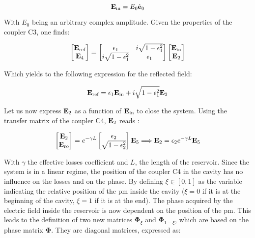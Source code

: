 \begin{equation}
	\mathbf{E}_{\text{in}} = E_0 \hat{\mathbf{e}}_0
\end{equation}

With $E_0$ being an arbitrary complex amplitude. Given the properties of the coupler C3, one finds:

\begin{equation}
	\begin{bmatrix}
		\mathbf{E}_{\text{ref}}\\
		\mathbf{E}_{\text{4}}
	\end{bmatrix} = \begin{bmatrix}
		\epsilon_1 & i\sqrt{1-\epsilon_1^2} \\
		i\sqrt{1-\epsilon_1^2} & \epsilon_1
	\end{bmatrix}
	\begin{bmatrix}
		\mathbf{E}_{\text{in}}\\
		\mathbf{E}_{\text{2}}
	\end{bmatrix} 
\end{equation}

Which yields to the following expression for the reflected field:

\begin{equation}
	\mathbf{E}_{\text{ref}} = \epsilon_1 \mathbf{E}_{\text{in}} + i \sqrt{1-\epsilon_1^2} \mathbf{E}_{\text{2}}
	\label{eq-ref}
\end{equation}

Let us now express $\mathbf{E}_{\text{2}}$ as a function of $\mathbf{E}_{\text{in}}$ to close the system. Using the transfer matrix of the coupler C4, $\mathbf{E}_{\text{2}}$ reads :

\begin{equation}
	\begin{bmatrix}
		\mathbf{E}_{\text{2}}\\
		\mathbf{E}_{\text{ro}}
	\end{bmatrix} = e^{-\gamma L} \begin{bmatrix}
		\epsilon_2\\
		\sqrt{1-\epsilon_2^2}
	\end{bmatrix} \mathbf{E}_{\text{5}} \Longrightarrow \mathbf{E}_{\text{2}} = \epsilon_2 e^{-\gamma L} \mathbf{E}_{\text{5}}
\end{equation}

With $\gamma$ the effective losses coefficient and $L$, the length of the reservoir. Since the system is in a linear regime, the position of the coupler C4 in the cavity has no influence on the losses and on the phase. By defining $\xi \in [0,1]$ as the variable indicating the relative position of the \gls{pm} inside the cavity ($\xi = 0$ if it is at the beginning of the cavity, $\xi=1$ if it is at the end). The phase acquired  by the electric field inside the reservoir is now dependent on the position of the \gls{pm}. This leads to the definition of two new matrices $\mathbf{\Phi}_\xi$ and $\mathbf{\Phi}_{1-\xi}$, which are based on the phase matrix $\mathbf{\Phi}$. They are diagonal matrices, expressed as:

